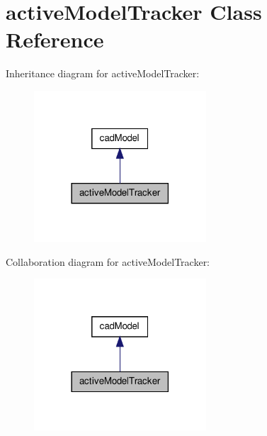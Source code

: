 \hypertarget{classactiveModelTracker}{\section{active\-Model\-Tracker \-Class \-Reference}
\label{classactiveModelTracker}
}


\-Inheritance diagram for active\-Model\-Tracker\-:
\nopagebreak
\begin{figure}[H]
\begin{center}
\leavevmode
\includegraphics[width=182pt]{classactiveModelTracker__inherit__graph}
\end{center}
\end{figure}


\-Collaboration diagram for active\-Model\-Tracker\-:
\nopagebreak
\begin{figure}[H]
\begin{center}
\leavevmode
\includegraphics[width=182pt]{classactiveModelTracker__coll__graph}
\end{center}
\end{figure}
